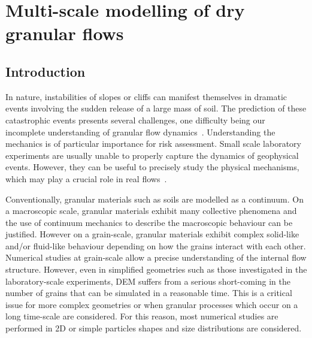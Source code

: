\chapter{Multi-scale modelling of dry granular flows}
\label{chapter:multiscale}

\ifpdf
    \graphicspath{{Chapter4/figs/raster/}{Chapter4/figs/pdf/}{Chapter4/figs/}}
\else
    \graphicspath{{Chapter4/figs/vector/}{Chapter4/figs/}}
\fi

\section{Introduction}

In nature, instabilities of slopes or cliffs can manifest themselves in 
dramatic events involving the sudden release of a large mass of soil. The 
prediction of these catastrophic 
events presents several challenges, one difficulty being our incomplete 
understanding of granular flow dynamics~\citep{Rondon2011}. Understanding 
the mechanics is of particular importance for risk assessment. Small scale 
laboratory experiments are usually unable to properly capture the 
dynamics of geophysical events. However, they can be useful to precisely study 
the physical mechanisms, which may play a crucial role in real 
flows~\citep{Iverson1997}. 

Conventionally, granular materials such as soils are modelled as a continuum. 
On a macroscopic scale, granular materials exhibit many collective phenomena 
and the use of continuum mechanics to describe the macroscopic behaviour can be 
justified. However on a grain-scale, granular materials exhibit complex 
solid-like and/or fluid-like behaviour depending on how the grains interact 
with each other. Numerical studies at grain-scale allow a precise 
understanding of the internal flow structure. However, even in simplified 
geometries such as those investigated in the laboratory-scale experiments, DEM 
suffers from a serious short-coming in the number of grains that can be 
simulated in a reasonable time. This is a critical issue for more complex 
geometries or when granular processes which occur on a long time-scale are 
considered. For this reason, most numerical studies are 
performed in 2D or simple particles shapes and size distributions are 
considered. 

